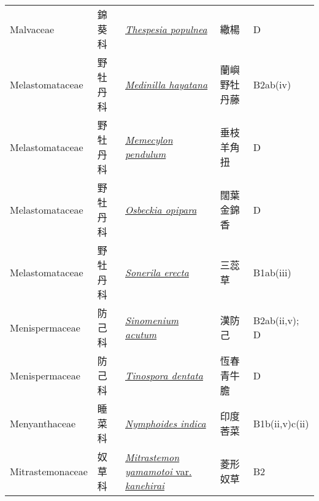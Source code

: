 {\begin{longtable}{L{2.5cm}L{2cm}L{5cm}L{2.5cm}L{3cm}}
    Malvaceae & 錦葵科 & \href{http://www.theplantlist.org/tpl1.1/search?q=Thespesia+populnea}{\textit{Thespesia populnea} } & 繖楊 & D    \\
    Melastomataceae & 野牡丹科 & \href{http://www.theplantlist.org/tpl1.1/search?q=Medinilla+hayatana}{\textit{Medinilla hayatana} } & 蘭嶼野牡丹藤 & B2ab(iv)    \\
    Melastomataceae & 野牡丹科 & \href{http://www.theplantlist.org/tpl1.1/search?q=Memecylon+pendulum}{\textit{Memecylon pendulum} } & 垂枝羊角扭 & D    \\
    Melastomataceae & 野牡丹科 & \href{http://www.theplantlist.org/tpl1.1/search?q=Osbeckia+opipara}{\textit{Osbeckia opipara} } & 闊葉金錦香 & D    \\
    Melastomataceae & 野牡丹科 & \href{http://www.theplantlist.org/tpl1.1/search?q=Sonerila+erecta}{\textit{Sonerila erecta} } & 三蕊草 & B1ab(iii)    \\
    Menispermaceae & 防己科 & \href{http://www.theplantlist.org/tpl1.1/search?q=Sinomenium+acutum}{\textit{Sinomenium acutum} } & 漢防己 & B2ab(ii,v); D    \\
    Menispermaceae & 防己科 & \href{http://www.theplantlist.org/tpl1.1/search?q=Tinospora+dentata}{\textit{Tinospora dentata} } & 恆春青牛膽 & D    \\
    Menyanthaceae & 睡菜科 & \href{http://www.theplantlist.org/tpl1.1/search?q=Nymphoides+indica}{\textit{Nymphoides indica} } & 印度莕菜 & B1b(ii,v)c(ii)    \\
    Mitrastemonaceae & 奴草科 & \href{http://www.theplantlist.org/tpl1.1/search?q=Mitrastemon+yamamotoi+var.+kanehirai}{\textit{Mitrastemon yamamotoi} var. \textit{kanehirai} } & 菱形奴草 & B2    \\

\end{longtable}}
